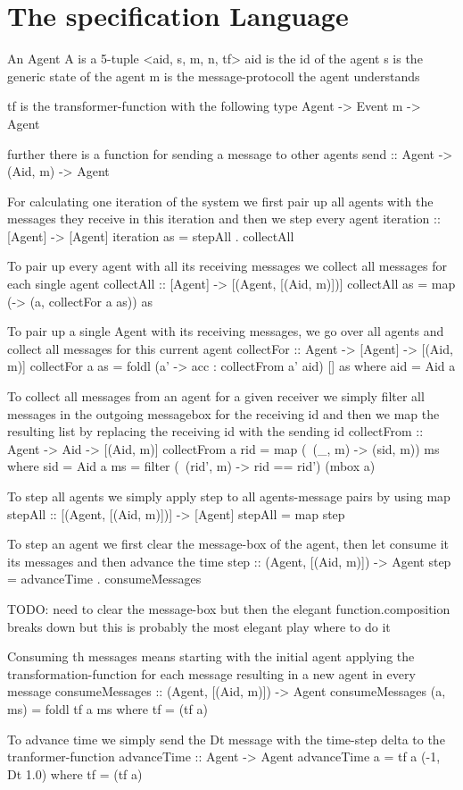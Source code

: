\section{The specification Language}

An Agent A is a 5-tuple <aid, s, m, n, tf>
aid is the id of the agent
s is the generic state of the agent
m is the message-protocoll the agent understands 


tf is the transformer-function with the following type Agent -> Event m -> Agent



further there is a function for sending a message to other agents
send :: Agent -> (Aid, m) -> Agent

For calculating one iteration of the system we first pair up all agents with the messages they receive in this iteration and then we step every agent
iteration :: [Agent] -> [Agent]
iteration as = stepAll . collectAll

To pair up every agent with all its receiving messages we collect all messages for each single agent
collectAll :: [Agent] -> [(Agent, [(Aid, m)])]
collectAll as = map (\a -> (a, collectFor a as)) as

To pair up a single Agent with its receiving messages, we go over all agents and collect all messages for this current agent
collectFor :: Agent -> [Agent] -> [(Aid, m)]
collectFor a as = foldl (\acc a' -> acc : collectFrom a' aid) [] as
	where
		aid = Aid a

To collect all messages from an agent for a given receiver we simply filter all messages in the outgoing messagebox for the receiving id and then we map the resulting list by replacing the receiving id with the sending id
collectFrom :: Agent -> Aid -> [(Aid, m)]
collectFrom a rid = map (\ (_, m) -> (sid, m)) ms
	where
		sid = Aid a
		ms = filter (\ (rid', m) -> rid == rid') (mbox a)

To step all agents we simply apply step to all agents-message pairs by using map
stepAll :: [(Agent, [(Aid, m)])] -> [Agent]
stepAll = map step

To step an agent we first clear the message-box of the agent, then let consume it its messages and then advance the time 
step :: (Agent, [(Aid, m)]) -> Agent
step = advanceTime . consumeMessages 

TODO: need to clear the message-box but then the elegant function.composition breaks down but this is probably the most elegant play where to do it

Consuming th messages means starting with the initial agent applying the transformation-function for each message resulting in a new agent in every message
consumeMessages :: (Agent, [(Aid, m)]) -> Agent
consumeMessages (a, ms) = foldl tf a ms
	where
		tf = (tf a)

To advance time we simply send the Dt message with the time-step delta to the tranformer-function
advanceTime :: Agent -> Agent
advanceTime a = tf a (-1, Dt 1.0)
	where
		tf = (tf a)